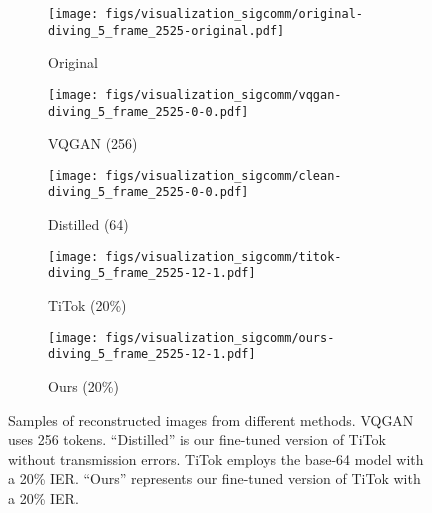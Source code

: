 \captionsetup[subfigure]{aboveskip=0pt, belowskip=1pt} %
\begin{figure}[t]
    \centering
    \begin{subfigure}[b]{0.09\textwidth}
        \texttt{[image: figs/visualization\_sigcomm/original-diving\_5\_frame\_2525-original.pdf]}
        \caption*{\scriptsize Original}
    \end{subfigure}
    \begin{subfigure}[b]{0.09\textwidth}
        \texttt{[image: figs/visualization\_sigcomm/vqgan-diving\_5\_frame\_2525-0-0.pdf]}
        \caption*{\scriptsize VQGAN (256)}
    \end{subfigure}
    \begin{subfigure}[b]{0.09\textwidth}
        \texttt{[image: figs/visualization\_sigcomm/clean-diving\_5\_frame\_2525-0-0.pdf]}
        \caption*{\scriptsize Distilled (64)}
    \end{subfigure}
        \begin{subfigure}[b]{0.09\textwidth}
        \texttt{[image: figs/visualization\_sigcomm/titok-diving\_5\_frame\_2525-12-1.pdf]}
        \caption*{\scriptsize TiTok (20\%)}
    \end{subfigure}
    \begin{subfigure}[b]{0.09\textwidth}
        \texttt{[image: figs/visualization\_sigcomm/ours-diving\_5\_frame\_2525-12-1.pdf]}
        \caption*{\scriptsize Ours (20\%)}
    \end{subfigure}
    \caption{Samples of reconstructed images from different methods. VQGAN uses 256 tokens. ``Distilled'' is our fine-tuned version of TiTok without transmission errors. TiTok employs the base-64 model with a 20\% IER. ``Ours'' represents our fine-tuned version of TiTok with a 20\% IER. %
    }
    \label{fig:semantic_compression_filtering_intuition}
    \vspace{3pt}

\end{figure}
